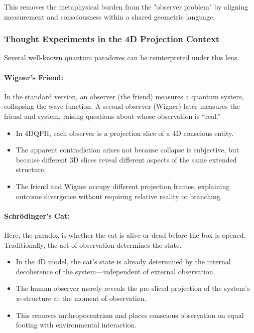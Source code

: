 \documentclass[12pt]{article}
\begin{document}
This removes the metaphysical burden from the "observer problem" by aligning measurement and consciousness within a shared geometric language.

\subsubsection*{Thought Experiments in the 4D Projection Context}

Several well-known quantum paradoxes can be reinterpreted under this lens.

\paragraph{Wigner's Friend:}
In the standard version, an observer (the friend) measures a quantum system, collapsing the wave function. A second observer (Wigner) later measures the friend and system, raising questions about whose observation is “real.”

\begin{itemize}
    \item In 4DQPH, each observer is a projection slice of a 4D conscious entity.
    \item The apparent contradiction arises not because collapse is subjective, but because different 3D slices reveal different aspects of the same extended structure.
    \item The friend and Wigner occupy different projection frames, explaining outcome divergence without requiring relative reality or branching.
\end{itemize}

\paragraph{Schrödinger’s Cat:}
Here, the paradox is whether the cat is alive or dead before the box is opened. Traditionally, the act of observation determines the state.

\begin{itemize}
    \item In the 4D model, the cat's state is already determined by the internal decoherence of the system—independent of external observation.
    \item The human observer merely reveals the pre-sliced projection of the system’s \( w \)-structure at the moment of observation.
    \item This removes anthropocentrism and places conscious observation on equal footing with environmental interaction.
\end{itemize}
\end{document}
